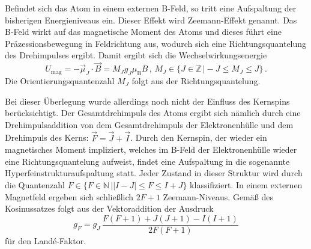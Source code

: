 Befindet sich das Atom in einem externen B-Feld, so tritt eine Aufspaltung der bisherigen 
Energieniveaus ein. Dieser Effekt wird Zeemann-Effekt genannt.
Das B-Feld wirkt auf das magnetische Moment des Atoms und dieses führt eine Präzessionsbewegung
in Feldrichtung aus, wodurch sich eine Richtungsquantelung des Drehimpulses ergibt. Damit 
ergibt sich die Wechselwirkungsenergie
\begin{equation}
	U_{\mathrm{mag}} = - \vec{\mu}_J \cdot \vec{B} = M_J g_J \mu_{\mathrm{B}} B \, \mathrm{,} \, M_J \in \{J \in \mathbb{Z} \, \vert -J \le M_J \le J\} \, \mathrm{.}
\end{equation}
Die Orientierungsquantenzahl $M_J$ folgt aus der Richtungsquantelung. 

Bei dieser Überlegung wurde allerdings noch nicht der Einfluss des Kernspins berücksichtigt.
Der Gesamtdrehimpuls des Atoms ergibt sich nämlich durch eine Drehimpulsaddition von dem 
Gesamtdrehimpuls der Elektronenhülle und dem Drehimpuls des Kerns: $\vec{F}=\vec{J}+\vec{I}$.
Durch den Kernspin, der wieder ein magnetisches Moment impliziert, welches im B-Feld der 
Elektronenhülle wieder eine Richtungsquantelung aufweist, findet eine Aufspaltung in die 
sogenannte Hyperfeinstrukturaufspaltung statt. Jeder Zustand in dieser Struktur wird durch
die Quantenzahl $F \in \{F \in \mathbb{N} \, \vert |I-J| \le F \le I+J \}$ klassifiziert.
In einem externen Magnetfeld ergeben sich schließlich $2F+1$ Zeemann-Niveaus.
Gemäß des Kosinussatzes folgt aus der Vektoraddition der Ausdruck 
\begin{equation}
	g_F = g_J \, \frac{F(F+1)+J(J+1)-I(I+1)}{2F(F+1)}
\end{equation}
für den Land\'{e}-Faktor.
